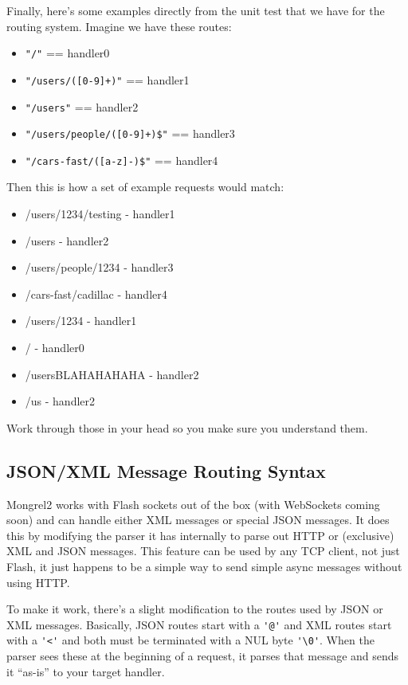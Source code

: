 Finally, here's some examples directly from the unit test that we have for
the routing system.  Imagine we have these routes:

\begin{itemize}
\item \verb|"/"| == handler0
\item \verb|"/users/([0-9]+)"| == handler1
\item \verb|"/users"| == handler2
\item \verb|"/users/people/([0-9]+)$"| == handler3
\item \verb|"/cars-fast/([a-z]-)$"| == handler4
\end{itemize}

Then this is how a set of example requests would match:

\begin{itemize}
\item /users/1234/testing - handler1
\item /users - handler2
\item /users/people/1234 - handler3
\item /cars-fast/cadillac - handler4
\item /users/1234 - handler1
\item / - handler0
\item /usersBLAHAHAHAHA - handler2
\item /us - handler2
\end{itemize}

Work through those in your head so you make sure you understand them.

\subsection{JSON/XML Message Routing Syntax}

Mongrel2 works with Flash sockets out of the box (with WebSockets coming soon)
and can handle either XML messages or special JSON messages.  It does this by
modifying the parser it has internally to parse out HTTP or (exclusive) XML
and JSON messages.  This feature can be used by any TCP client, not just Flash,
it just happens to be a simple way to send simple async messages without using HTTP.

To make it work, there's a slight modification to the routes used by
JSON or XML messages.  Basically, JSON routes start with a \verb|'@'| and XML routes
start with a \verb|'<'| and both must be terminated with a NUL byte \verb|'\0'|.  When the
parser sees these at the beginning of a request, it parses that message and
sends it ``as-is'' to your target handler.

